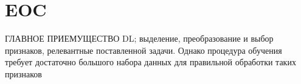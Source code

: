 \documentclass[12pt]{article}
\begin{document}
\begin{sloppypar}

\section{EOC}
ГЛАВНОЕ ПРИЕМУЩЕСТВО DL; выделение, преобразование и выбор признаков, релевантные поставленной задачи.  Однако процедура обучения требует достаточно большого набора данных для правильной обработки таких  признаков 





\end{sloppypar}
\end{document}
